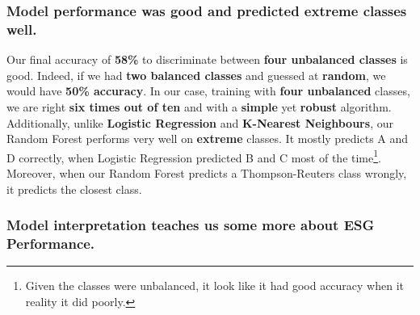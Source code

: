 \documentclass[12pt]{report}
\begin{document}
\subsubsection{Model performance was good and predicted extreme classes well.}
Our final accuracy of \textbf{58\%} to discriminate between \textbf{four unbalanced classes} is good.\newline
Indeed, if we had \textbf{two balanced classes} and guessed at \textbf{random}, we would have \textbf{50\% accuracy}. In our case, training with \textbf{four unbalanced} classes, we are right \textbf{six times out of ten} and with a \textbf{simple} yet \textbf{robust} algorithm.\newline
Additionally, unlike \textbf{Logistic Regression} and \textbf{K-Nearest Neighbours}, our Random Forest performs very well on \textbf{extreme} classes. It mostly predicts A and D correctly, when Logistic Regression predicted B and C most of the time\footnote{Given the classes were unbalanced, it look like it had good accuracy when it reality it did poorly.}. Moreover, when our Random Forest predicts a Thompson-Reuters class wrongly, it predicts the closest class.\newline

\subsubsection{Model interpretation teaches us some more about ESG Performance.}
\end{document}

